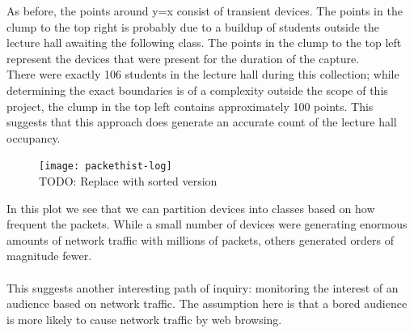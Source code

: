 \documentclass[letterpaper,abstract=on,titlepage=false]{scrreprt}
\begin{document}
	As before, the points around y=x consist of transient devices.
	The points in the clump to the top right is probably due to a buildup of students outside the lecture hall awaiting the following class.
	The points in the clump to the top left represent the devices that were present for the duration of the capture.
	\\
	There were exactly 106 students in the lecture hall during this collection; while determining the exact boundaries is of a complexity outside the scope of this project, the clump in the top left contains approximately 100 points.
	This suggests that this approach does generate an accurate count of the lecture hall occupancy.

	\begin{figure}[H]
		\texttt{[image: packethist-log]}
		\centering
		\\TODO: Replace with sorted version
	\end{figure}

	In this plot we see that we can partition devices into classes based on how frequent the packets.
	While a small number of devices were generating enormous amounts of network traffic with millions of packets, others generated orders of magnitude fewer.
	\\\\
	This suggests another interesting path of inquiry: monitoring the interest of an audience based on network traffic.
	The assumption here is that a bored audience is more likely to cause network traffic by web browsing.
\end{document}
